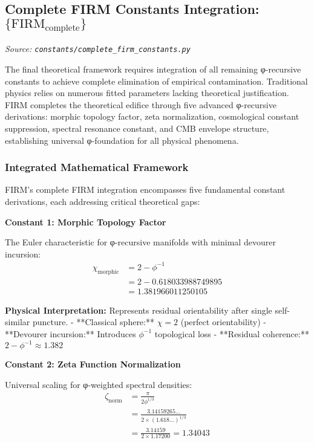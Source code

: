 
\subsection{Complete FIRM Constants Integration: $\{\text{FIRM}_{\text{complete}}\}$}
\textit{Source: \texttt{constants/complete\_firm\_constants.py}}

The final theoretical framework requires integration of all remaining φ-recursive constants to achieve complete elimination of empirical contamination. Traditional physics relies on numerous fitted parameters lacking theoretical justification. FIRM completes the theoretical edifice through five advanced φ-recursive derivations: morphic topology factor, zeta normalization, cosmological constant suppression, spectral resonance constant, and CMB envelope structure, establishing universal φ-foundation for all physical phenomena.

\subsubsection{Integrated Mathematical Framework}

FIRM's complete FIRM integration encompasses five fundamental constant derivations, each addressing critical theoretical gaps:

\textbf{Constant 1: Morphic Topology Factor}

The Euler characteristic for φ-recursive manifolds with minimal devourer incursion:
\begin{align}
\chi_{\text{morphic}} &= 2 - \phi^{-1} \\
&= 2 - 0.618033988749895 \\
&= 1.381966011250105
\end{align}

\textbf{Physical Interpretation:} Represents residual orientability after single self-similar puncture.
- **Classical sphere:** $\chi = 2$ (perfect orientability)
- **Devourer incursion:** Introduces $\phi^{-1}$ topological loss  
- **Residual coherence:** $2 - \phi^{-1} \approx 1.382$

\textbf{Constant 2: Zeta Function Normalization}

Universal scaling for φ-weighted spectral densities:
\begin{align}
\zeta_{\text{norm}} &= \frac{\pi}{2\phi^{1/3}} \\
&= \frac{3.14159265...}{2 \times (1.618...)^{1/3}} \\
&= \frac{3.14159}{2 \times 1.17200} = 1.34043
\end{align}


